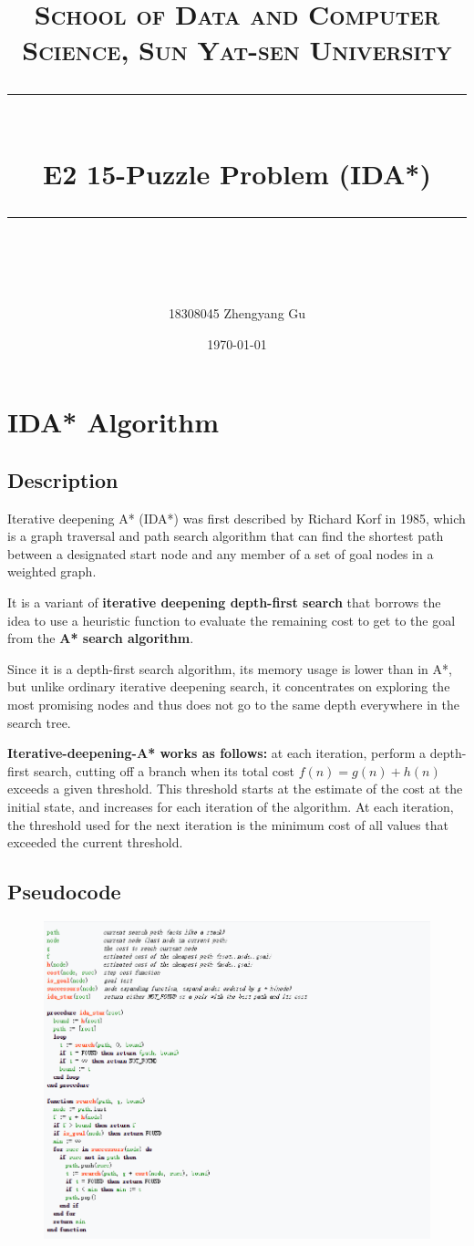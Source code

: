 \documentclass[a4paper, 11pt]{article}
\title{	
\normalfont \normalsize
\textsc{School of Data and Computer Science, Sun Yat-sen University} \\ [25pt] %
\rule{\textwidth}{0.5pt} \\[0.4cm] %
\huge  E2 15-Puzzle Problem (IDA*)\\ %
\rule{\textwidth}{2pt} \\[0.5cm] %
\author{18308045 Zhengyang Gu}
\date{\normalsize\today}
}
\begin{document}
\maketitle
\tableofcontents
\newpage

\section{IDA* Algorithm}
\subsection{Description}
Iterative deepening A* (IDA*) was first described by Richard Korf in 1985, which is a graph traversal and path search algorithm that can find the shortest path between a designated start node and any member of a set of goal nodes in a weighted graph.

It is a variant of \textbf{iterative deepening depth-first search} that borrows the idea to use a heuristic function to evaluate the remaining cost to get to the goal from the \textbf{A* search algorithm}.

Since it is a depth-first search algorithm, its memory usage is lower than in A*, but unlike ordinary iterative deepening search, it concentrates on exploring the most promising nodes and thus does not go to the same depth everywhere in the search tree.

\textbf{Iterative-deepening-A* works as follows:} at each iteration, perform a depth-first search, cutting off a branch when its total cost $f(n)=g(n)+h(n)$ exceeds a given threshold. This threshold starts at the estimate of the cost at the initial state, and increases for each iteration of the algorithm. At each iteration, the threshold used for the next iteration is the minimum cost of all values that exceeded the current threshold.
\subsection{Pseudocode}
\begin{figure}[ht]
	\centering
	\includegraphics[width=17.3cm]{Pic/code}
\end{figure}
\end{document}
